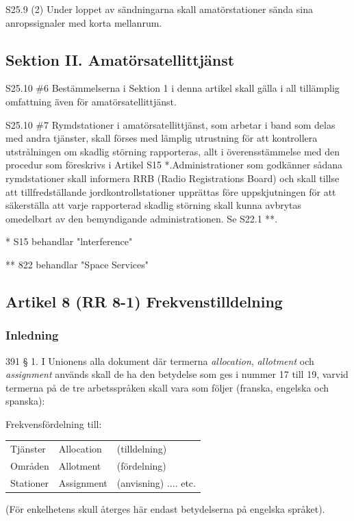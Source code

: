 S25.9 (2) Under loppet av sändningarna skall amatörstationer sända
sina anropssignaler med korta mellanrum.

\subsection{Sektion II. Amatörsatellittjänst}

S25.10 \#6 Bestämmelserna i Sektion 1 i denna artikel skall gälla i all
tillämplig omfattning även för amatörsatellittjänst.

S25.10 \#7 Rymdstationer i amatörsatellittjänst, som arbetar i band som
delas med andra tjänster, skall förses med lämplig utrustning för att
kontrollera utstrålningen om skadlig störning rapporteras, allt i
överensstämmelse med den procedur som föreskrivs i Artikel S15
*.Administrationer som godkänner sådana rymdstationer skall informera
RRB (Radio Registrations Board) och skall tillse att tillfredställande
jordkontrollstationer upprättas före uppskjutningen för att
säkerställa att varje rapporterad skadlig störning skall kunna
avbrytas omedelbart av den bemyndigande administrationen. Se S22.1 **.

* S15 behandlar "lnterference"

** 822 behandlar "Space Services"

\subsection{Artikel 8 (RR 8-1) Frekvenstilldelning}

\subsubsection{Inledning}

391 § 1. I Unionens alla dokument där termerna \emph{allocation},
\emph{allotment} och \emph{assignment} används skall de ha den
betydelse som ges i nummer 17 till 19, varvid termerna på de tre
arbetsspråken skall vara som följer (franska, engelska och spanska):

Frekvensfördelning till:
\begin{tabular}{lll}
  Tjänster & Allocation & (tilldelning) \\
  Områden & Allotment & (fördelning) \\
  Stationer & Assignment & (anvisning) .... etc. \\
\end{tabular}
(För enkelhetens skull återges här endast
betydelserna på engelska språket).


